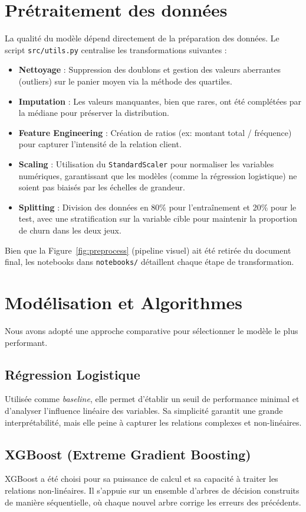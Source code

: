 \documentclass[12pt,a4paper]{article}
\begin{document}
\section{Prétraitement des données}
La qualité du modèle dépend directement de la préparation des données. Le script \texttt{src/utils.py} centralise les transformations suivantes :

\begin{itemize}
  \item \textbf{Nettoyage} : Suppression des doublons et gestion des valeurs aberrantes (outliers) sur le panier moyen via la méthode des quartiles.
  \item \textbf{Imputation} : Les valeurs manquantes, bien que rares, ont été complétées par la médiane pour préserver la distribution.
  \item \textbf{Feature Engineering} : Création de ratios (ex: montant total / fréquence) pour capturer l'intensité de la relation client.
  \item \textbf{Scaling} : Utilisation du \texttt{StandardScaler} pour normaliser les variables numériques, garantissant que les modèles (comme la régression logistique) ne soient pas biaisés par les échelles de grandeur.
  \item \textbf{Splitting} : Division des données en 80\% pour l'entraînement et 20\% pour le test, avec une stratification sur la variable cible pour maintenir la proportion de churn dans les deux jeux.
\end{itemize}
Bien que la Figure~\ref{fig:preprocess} (pipeline visuel) ait été retirée du document final, les notebooks dans \texttt{notebooks/} détaillent chaque étape de transformation.
\section{Modélisation et Algorithmes}
Nous avons adopté une approche comparative pour sélectionner le modèle le plus performant.

\subsection{Régression Logistique}
Utilisée comme \textit{baseline}, elle permet d'établir un seuil de performance minimal et d'analyser l'influence linéaire des variables. Sa simplicité garantit une grande interprétabilité, mais elle peine à capturer les relations complexes et non-linéaires.

\subsection{XGBoost (Extreme Gradient Boosting)}
XGBoost a été choisi pour sa puissance de calcul et sa capacité à traiter les relations non-linéaires. Il s'appuie sur un ensemble d'arbres de décision construits de manière séquentielle, où chaque nouvel arbre corrige les erreurs des précédents.
\end{document}
